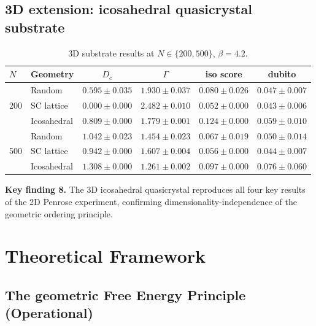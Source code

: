 \documentclass[12pt,a4paper]{article}
\theoremstyle{plain}
\theoremstyle{definition}
\begin{document}
\subsection{3D extension: icosahedral quasicrystal substrate}
\label{sec:3d}

\begin{table}[H]
\centering
\caption{3D substrate results at $N \in \{200, 500\}$, $\beta = 4.2$.}
\label{tab:3d_results}
\begin{tabular}{llcccc}
\toprule
$N$ & Geometry & $D_c$ & $\Gamma$ & iso score & dubito \\
\midrule
\multirow{3}{*}{200} &
  Random      & $0.595 \pm 0.035$ & $1.930 \pm 0.037$ &
  $0.080 \pm 0.026$ & $0.047 \pm 0.007$ \\
& SC lattice  & $0.000 \pm 0.000$ & $2.482 \pm 0.010$ &
  $0.052 \pm 0.000$ & $0.043 \pm 0.006$ \\
& Icosahedral & $0.809 \pm 0.000$ & $1.779 \pm 0.001$ &
  $\mathbf{0.124 \pm 0.000}$ & $0.059 \pm 0.010$ \\
\midrule
\multirow{3}{*}{500} &
  Random      & $1.042 \pm 0.023$ & $1.454 \pm 0.023$ &
  $0.067 \pm 0.019$ & $0.050 \pm 0.014$ \\
& SC lattice  & $0.942 \pm 0.000$ & $1.607 \pm 0.004$ &
  $0.056 \pm 0.000$ & $0.044 \pm 0.007$ \\
& Icosahedral & $1.308 \pm 0.000$ & $\mathbf{1.261 \pm 0.002}$ &
  $\mathbf{0.097 \pm 0.000}$ & $0.076 \pm 0.060$ \\
\bottomrule
\end{tabular}
\end{table}

\begin{keyresult}
\textbf{Key finding 8.} The 3D icosahedral quasicrystal reproduces all
four key results of the 2D Penrose experiment, confirming
dimensionality-independence of the geometric ordering principle.
\end{keyresult}

\section{Theoretical Framework}
\label{sec:theory}

\subsection{The geometric Free Energy Principle (Operational)}
\end{document}
